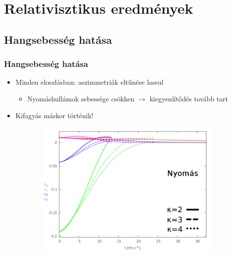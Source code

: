 \documentclass{beamer}
\begin{document}
\begin{frame}
\begin{center}
\begin{figure}[H]
\begin{subfigure}[b]{0.49\textwidth}
	\end{subfigure}
\end{figure}
\end{center}
\end{frame}


\section{Relativisztikus eredmények}
\subsection{Hangsebesség hatása}
\begin{frame}
\frametitle{Hangsebesség hatása}
\begin{center}
\begin{itemize}
\setlength{\itemsep}{12pt}
\item<1-> Minden eloszlásban: aszimmetriák eltűnése lassul
\vspace{8pt}
\begin{itemize}
\item<1-> Nyomáshullámok sebessége csökken $\rightarrow$ kiegyenlítődés tovább tart
\end{itemize}
\item<1-> Kifagyás máskor történik!
\end{itemize}
\begin{figure}[H]
	\centering
    \begin{subfigure}[b]{0.49\textwidth}
    		\includegraphics[width=\textwidth]{pic/res/rel/eps_kappa_p}
	\end{subfigure}
	\begin{subfigure}[b]{0.49\textwidth}

\end{subfigure}
\end{figure}
\end{center}
\end{frame}
\end{document}
